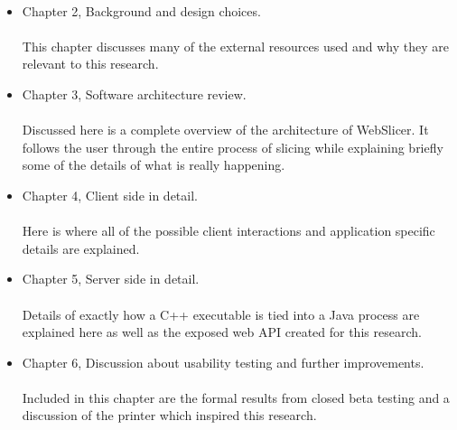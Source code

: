 \paragraph{}
\begin{itemize}
\item Chapter 2, Background and design choices.
	\paragraph{}
	This chapter discusses many of the external resources used and why they are relevant to this research.
\item Chapter 3, Software architecture review.
	\paragraph{}
	Discussed here is a complete overview of the architecture of WebSlicer. It follows the user through the entire process of slicing while explaining briefly some of the details of what is really happening.
\item Chapter 4, Client side in detail. 
	\paragraph{}
	Here is where all of the possible client interactions and application specific details are explained.
\item Chapter 5, Server side in detail.
	\paragraph{}
	Details of exactly how a C++ executable is tied into a Java process are explained here as well as the exposed web API created for this research.
\item Chapter 6, Discussion about usability testing and further improvements.
	\paragraph{}
	Included in this chapter are the formal results from closed beta testing and a discussion of the printer which inspired this research.
\end{itemize}

